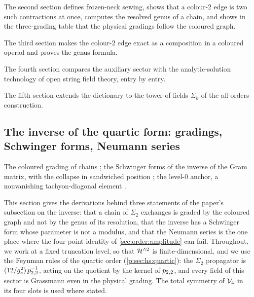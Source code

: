 

The second section defines frozen-neck sewing, shows that a colour-2 edge is two such contractions at once, computes the resolved genus of a chain, and shows in the three-grading table that the physical gradings follow the coloured graph.



The third section makes the colour-2 edge exact as a composition in a coloured operad and proves the genus formula.



The fourth section compares the auxiliary sector with the analytic-solution technology of open string field theory, entry by entry.



The fifth section extends the dictionary to the tower of fields $\Sigma_k$ of the all-orders construction.



\subsection{The inverse of the quartic form: gradings, Schwinger forms, Neumann series}
\label{sec:ws1:inverse-full}

The coloured grading of chains ; the Schwinger forms of the inverse of the Gram matrix, with the collapse in sandwiched position ; the level-$0$ anchor, a nonvanishing tachyon-diagonal element .

This section gives the derivations behind three statements of the paper's subsection on the inverse: that a chain of $\Sigma_2$ exchanges is graded by the coloured graph and not by the genus of its resolution, that the inverse has a Schwinger form whose parameter is not a modulus, and that the Neumann series is the one place where the four-point identity of \cref{sec:order:amplitude} can fail.
Throughout, we work at a fixed truncation level, so that $\mathcal{H}^{\wedge 2}$ is finite-dimensional, and we use the Feynman rules of the quartic order (\cref{p:sec:hs:quartic}): the $\Sigma_2$ propagator is $(12 / g_s^2) \, p_{2,2}^{-1}$, acting on the quotient by the kernel of $p_{2,2}$, and every field of this sector is Grassmann even in the physical grading.
The total symmetry of $\mathcal{V}_{4}$ in its four slots is used where stated.

